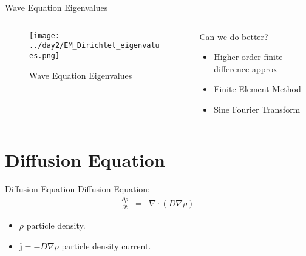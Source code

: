 \documentclass[aspectratio=169]{beamer}
\begin{document}
\begin{frame}{Wave Equation Eigenvalues}
    \begin{columns}
        \begin{column}{0.5\textwidth}
            \centering 
            \begin{figure}
            \texttt{[image: ../day2/EM\_Dirichlet\_eigenvalues.png]} \\
            \caption{Wave Equation Eigenvalues} 
            \end{figure}
        \end{column}
    
        \pause
        \begin{column}{0.5\textwidth}
            Can we do better?
            \pause
            \begin{itemize}
                \item Higher order finite difference approx
                \pause
                \item Finite Element Method
                \pause
                \item Sine Fourier Transform
            \end{itemize}
        \end{column}

    \end{columns}
\end{frame}



\section{Diffusion Equation}

\begin{frame}{Diffusion Equation}
    Diffusion Equation:
    \begin{eqnarray}
        \frac{\partial \rho}{\partial t} & = & \nabla \cdot \left(D \nabla \rho \right)
    \end{eqnarray}
    \begin{itemize}
        \item $\rho$ particle density.
        \item $\bm{j} = - D \nabla \rho$ particle density current.
    \end{itemize}
\end{frame}
\end{document}
